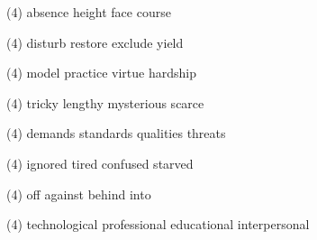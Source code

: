 \item
\begin{tasks}(4)
	\task absence
	\task height
	\task face
	\task course
\end{tasks}
\item
\begin{tasks}(4)
	\task disturb
	\task restore
	\task exclude
	\task yield
\end{tasks}
\item
\begin{tasks}(4)
	\task model
	\task practice
	\task virtue
	\task hardship
\end{tasks}
\item
\begin{tasks}(4)
	\task tricky
	\task lengthy
	\task mysterious
	\task scarce
\end{tasks}
\item
\begin{tasks}(4)
	\task demands
	\task standards
	\task qualities
	\task threats
\end{tasks}
\item
\begin{tasks}(4)
	\task ignored
	\task tired
	\task confused
	\task starved
\end{tasks}
\item
\begin{tasks}(4)
	\task off
	\task against
	\task behind
	\task into
\end{tasks}
\item
\begin{tasks}(4)
	\task technological
	\task professional
	\task educational
	\task interpersonal
\end{tasks}